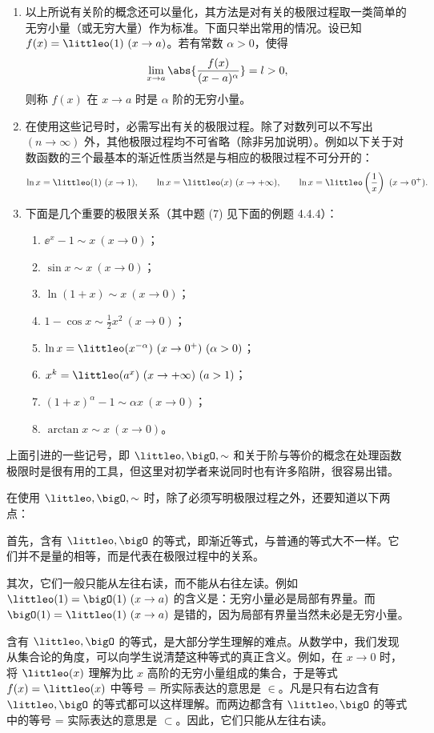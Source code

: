\begin{enumerate}[start=7]
  \item 以上所说有关阶的概念还可以量化，其方法是对有关的极限过程取一类简单的无穷小量（或无穷大量）作为标准。下面只举出常用的情况。设已知 $f(x)=\littleo(1)\ (x\to a)$。若有常数 $\alpha>0$，使得
  \[
    \lim_{x\to a}\abs{\frac{f(x)}{(x-a)^\alpha}}=l>0,
  \]
  则称 $f(x)$ 在 $x\to a$ 时是 $\alpha$ 阶的无穷小量。
  \item 在使用这些记号时，必需写出有关的极限过程。除了对数列可以不写出 $(n\to\infty)$ 外，其他极限过程均不可省略（除非另加说明）。例如以下关于对数函数的三个最基本的渐近性质当然是与相应的极限过程不可分开的：
  \[
    \ln x=\littleo(1)\ (x\to1),\qquad
    \ln x=\littleo(x)\ (x\to+\infty),\qquad
    \ln x=\littleo\left(\frac1x\right)\ (x\to0^+).
  \]
  \item 下面是几个重要的极限关系（其中题 (7) 见下面的例题 4.4.4）：
  \begin{enumerate}
    \item $\ee^x-1\sim x\ (x\to0)$；
    \item $\sin x\sim x\ (x\to0)$；
    \item $\ln(1+x)\sim x\ (x\to0)$；
    \item $1-\cos x\sim\frac12x^2\ (x\to0)$；
    \item $\ln x=\littleo(x^{-\alpha})\ (x\to0^+)\ (\alpha>0)$；
    \item $x^k=\littleo(a^x)\ (x\to+\infty)\ (a>1)$；
    \item $(1+x)^\alpha-1\sim\alpha x\ (x\to0)$；
    \item $\arctan x\sim x\ (x\to0)$。
  \end{enumerate}
\end{enumerate}

上面引进的一些记号，即 $\littleo,\bigO,\sim$ 和关于阶与等价的概念在处理函数极限时是很有用的工具，但这里对初学者来说同时也有许多陷阱，很容易出错。

在使用 $\littleo,\bigO,\sim$ 时，除了必须写明极限过程之外，还要知道以下两点：

首先，含有 $\littleo,\bigO$ 的等式，即渐近等式，与普通的等式大不一样。它们并不是量的相等，而是代表在极限过程中的关系。

其次，它们一般只能从左往右读，而不能从右往左读。例如 $\littleo(1)=\bigO(1)\ (x\to a)$ 的含义是：无穷小量必是局部有界量。而 $\bigO(1)=\littleo(1)\ (x\to a)$ 是错的，因为局部有界量当然未必是无穷小量。

\begin{xremark}
含有 $\littleo,\bigO$ 的等式，是大部分学生理解的难点。从数学中，我们发现从集合论的角度，可以向学生说清楚这种等式的真正含义。例如，在 $x\to0$ 时，将 $\littleo(x)$ 理解为比 $x$ 高阶的无穷小量组成的集合，于是等式 $f(x)=\littleo(x)$ 中等号 = 所实际表达的意思是 $\in$。凡是只有右边含有 $\littleo,\bigO$ 的等式都可以这样理解。而两边都含有 $\littleo,\bigO$ 的等式中的等号 = 实际表达的意思是 $\subset$。因此，它们只能从左往右读。
\end{xremark}

